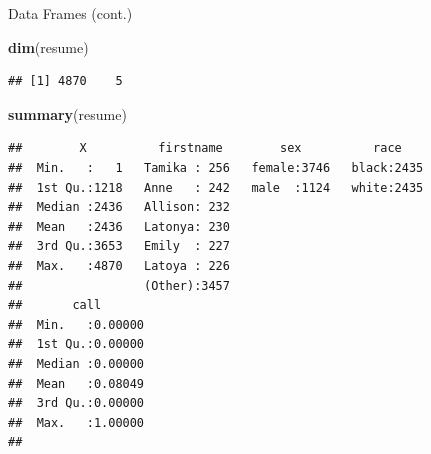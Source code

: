 \documentclass[ignorenonframetext,]{beamer}
\newenvironment{Shaded}{\begin{snugshade}}{\end{snugshade}}
\newcommand{\KeywordTok}[1]{\textcolor[rgb]{0.13,0.29,0.53}{\textbf{#1}}}
\newcommand{\NormalTok}[1]{#1}
\begin{document}
\begin{frame}[fragile]{Data Frames (cont.)}

\begin{Shaded}
\begin{Highlighting}[]
\KeywordTok{dim}\NormalTok{(resume)}
\end{Highlighting}
\end{Shaded}

\begin{verbatim}
## [1] 4870    5
\end{verbatim}

\begin{Shaded}
\begin{Highlighting}[]
\KeywordTok{summary}\NormalTok{(resume)}
\end{Highlighting}
\end{Shaded}

\begin{verbatim}
##        X          firstname        sex          race     
##  Min.   :   1   Tamika : 256   female:3746   black:2435  
##  1st Qu.:1218   Anne   : 242   male  :1124   white:2435  
##  Median :2436   Allison: 232                             
##  Mean   :2436   Latonya: 230                             
##  3rd Qu.:3653   Emily  : 227                             
##  Max.   :4870   Latoya : 226                             
##                 (Other):3457                             
##       call        
##  Min.   :0.00000  
##  1st Qu.:0.00000  
##  Median :0.00000  
##  Mean   :0.08049  
##  3rd Qu.:0.00000  
##  Max.   :1.00000  
## 
\end{verbatim}

\end{frame}
\end{document}
